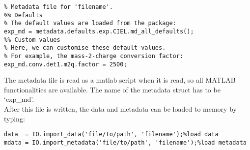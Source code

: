 \begin{lstlisting}
% Metadata file for 'filename'.
%% Defaults
% The default values are loaded from the package:
exp_md = metadata.defaults.exp.CIEL.md_all_defaults();
%% Custom values
% Here, we can customise these default values.
% For example, the mass-2-charge conversion factor:
exp_md.conv.det1.m2q.factor = 2500;
\end{lstlisting}

The metadata file is read as a matlab script when it is read, so all MATLAB functionalities are available. The name of the metadata struct has to be `exp\_md'. \\
After this file is written, the data and metadata can be loaded to memory by typing:


\begin{lstlisting}
data  = IO.import_data('file/to/path', 'filename');%load data
mdata = IO.import_metadata('file/to/path', 'filename');%load metadata
\end{lstlisting}

